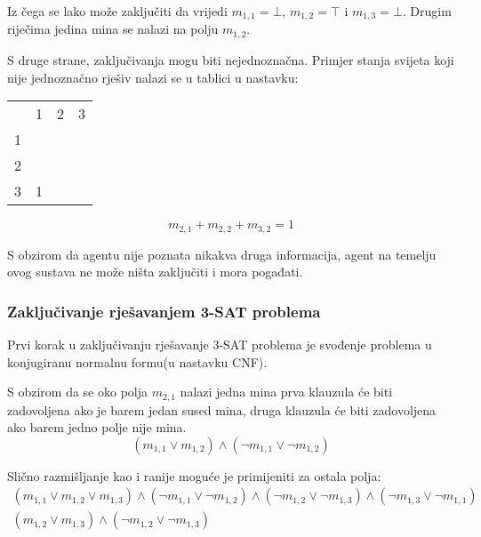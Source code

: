 \documentclass{article}
\begin{document}
Iz čega se lako može zaključiti da vrijedi $m_{1, 1} = \bot$, $m_{1, 2} = \top$ i
$m_{1, 3} = \bot$. Drugim riječima jedina mina se nalazi na polju $m_{1, 2}$.

S druge strane, zaključivanja mogu biti nejednoznačna. Primjer stanja svijeta koji nije
jednoznačno rješiv nalazi se u tablici u nastavku:
\begin{table}[ht]
    \centering
    \begin{tabular}{llll}
                           & 1                      & 2                     & 3                     \\ \cline{2-4}
    \multicolumn{1}{l|}{1} & \multicolumn{1}{l|}{}  & \multicolumn{1}{l|}{} & \multicolumn{1}{l|}{} \\ \cline{2-4}
    \multicolumn{1}{l|}{2} & \multicolumn{1}{l|}{}  & \multicolumn{1}{l|}{} & \multicolumn{1}{l|}{} \\ \cline{2-4}
    \multicolumn{1}{l|}{3} & \multicolumn{1}{l|}{1} & \multicolumn{1}{l|}{} & \multicolumn{1}{l|}{} \\ \cline{2-4}
    \end{tabular}
\end{table}

\begin{equation*}
    m_{2, 1} + m_{2, 2} + m_{3, 2} = 1
\end{equation*}

S obzirom da agentu nije poznata nikakva druga informacija, agent na temelju ovog sustava ne
može ništa zaključiti i mora pogađati.

\subsubsection{Zaključivanje rješavanjem 3-SAT problema}
Prvi korak u zaključivanju rješavanje 3-SAT problema je svođenje problema u konjugiranu
normalnu formu(u nastavku CNF).

S obzirom da se oko polja $m_{2, 1}$ nalazi jedna mina prva klauzula će biti zadovoljena ako
je barem jedan sused mina, druga klauzula će biti zadovoljena ako barem jedno polje nije mina.
\begin{equation*}
    (m_{1, 1} \vee m_{1, 2}) \wedge (\neg m_{1, 1} \vee \neg m_{1, 2})
\end{equation*}

Slično razmišljanje kao i ranije moguće je primijeniti za ostala polja:
\begin{gather*}
    (m_{1, 1} \vee m_{1, 2} \vee m_{1, 3}) \wedge
        (\neg m_{1, 1} \vee \neg m_{1, 2}) \wedge
        (\neg m_{1, 2} \vee \neg m_{1, 3}) \wedge
        (\neg m_{1, 3} \vee \neg m_{1, 1}) \\
    (m_{1, 2} \vee m_{1, 3}) \wedge (\neg m_{1, 2} \vee \neg m_{1, 3})
\end{gather*}
\end{document}
